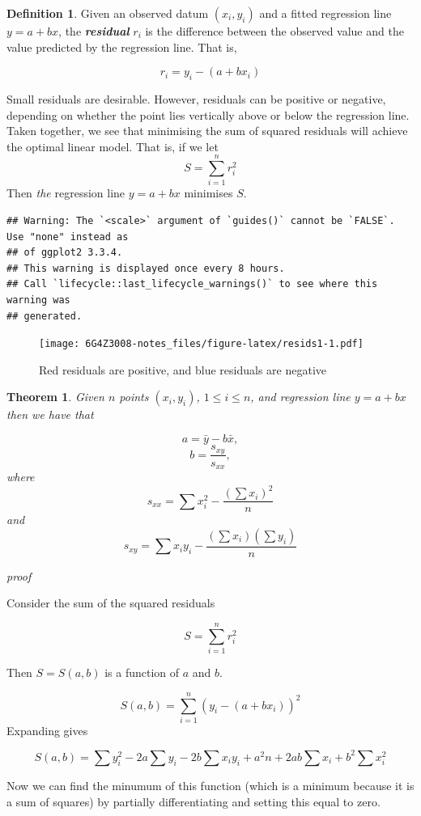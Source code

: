 \documentclass[
]{book}
\newtheorem{theorem}{Theorem}[chapter]
\theoremstyle{definition}
\newtheorem{definition}{Definition}[chapter]
\theoremstyle{definition}
\theoremstyle{definition}
\theoremstyle{definition}
\theoremstyle{remark}
\begin{document}
\begin{definition}
Given an observed datum \((x_i,y_i)\) and a fitted regression line \(y=a+bx\), the \textbf{\emph{residual}} \(r_i\) is the difference between the observed value and the value predicted by the regression line. That is,

\[r_i = y_i - (a+bx_i)\]
\end{definition}

Small residuals are desirable. However, residuals can be positive or negative, depending on whether the point lies vertically above or below the regression line. Taken together, we see that minimising the sum of squared residuals will achieve the optimal linear model. That is, if we let
\[S = \sum_{i=1}^{n}r_i^2\]
Then \emph{the} regression line \(y=a+bx\) minimises \(S\).

\begin{verbatim}
## Warning: The `<scale>` argument of `guides()` cannot be `FALSE`. Use "none" instead as
## of ggplot2 3.3.4.
## This warning is displayed once every 8 hours.
## Call `lifecycle::last_lifecycle_warnings()` to see where this warning was
## generated.
\end{verbatim}

\begin{figure}
\centering
\texttt{[image: 6G4Z3008-notes\_files/figure-latex/resids1-1.pdf]}
\caption{\label{fig:resids1}Red residuals are positive, and blue residuals are negative}
\end{figure}

\begin{theorem}
Given \(n\) points \((x_i,y_i)\), \(1\leq i\leq n\), and regression line \(y=a+bx\) then we have that

\[a = \bar{y}-b\bar{x},\]
\[b = \frac{s_{xy}}{s_{xx}},\]
where
\[s_{xx} = \sum x_i^2 - \frac{(\sum x_i )^2}{n}\]
and
\[s_{xy} = \sum x_iy_i - \frac{(\sum x_i )(\sum y_i )}{n} \]
\end{theorem}

\emph{proof}

Consider the sum of the squared residuals

\[S = \sum_{i=1}^{n} r_i^2\]

Then \(S=S(a,b)\) is a function of \(a\) and \(b\).

\[S(a,b)=\sum_{i=1}^{n} (y_i - (a+bx_i))^2\]
Expanding gives

\[S(a,b) = \sum y_i^2 - 2a\sum y_i - 2b\sum x_i y_i + a^2n + 2ab\sum x_i + b^2 \sum x_i^2\]

Now we can find the minumum of this function (which is a minimum because it is a sum of squares) by partially differentiating and setting this equal to zero.
\end{document}
